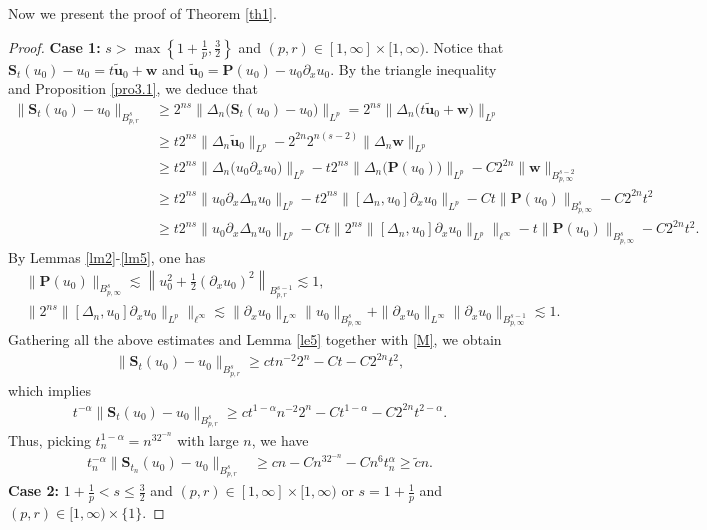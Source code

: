 \documentclass[12pt]{article}
\newcommand{\bal}{\begin{align}}
\newcommand{\bbal}{\begin{align*}}
\newcommand{\pa}{\partial}
\newcommand{\fr}{\frac}
\newcommand{\De}{\Delta}
\newcommand{\les}{\lesssim}
\newcommand{\f}{\left}
\newcommand{\g}{\right}
\begin{document}
Now we present the proof of Theorem \ref{th1}.
\begin{proof}

{\bf Case 1:} $s>\max\f\{1+\frac{1}{p},\frac{3}{2}\g\}$ and $(p, r)\in [1, \infty]\times [1, \infty)$.
Notice that $\mathbf{S}_{t}(u_0)-u_0=t\mathbf{\widetilde{u}}_0+\mathbf{w}$ and $\mathbf{\widetilde{u}}_0=\mathbf{P}(u_0)-u_0\pa_x u_0.$ By the triangle inequality and Proposition \ref{pro3.1}, we deduce that
\bal\label{M}
\|\mathbf{S}_{t}(u_0)-u_0\|_{B^{s}_{p,r}}
&\geq2^{{ns}}
\big\|\De_{n}\big(\mathbf{S}_{t}(u_0)-u_0\big)\big\|_{L^p}
=2^{{ns}}\big\|\De_{n}\big(t\mathbf{\widetilde{u}}_0+\mathbf{w}\big)\big\|_{L^p}
\nonumber\\&\geq t2^{{ns}}\|\De_{n}\mathbf{\widetilde{u}}_0\|_{L^p}
-2^{{2n}}2^{{n(s-2)}}
\big\|\De_{n}\mathbf{w}\big\|_{L^p}\nonumber\\
&\geq t2^{{n}s}\|\De_{n}\big(u_0\pa_xu_0\big)\|_{L^p}-
t2^{{n}s}\|\De_{n}\big(\mathbf{P}(u_0)\big)\|_{L^p}-C2^{2{n}}\|\mathbf{w}\|_{B^{s-2}_{p,\infty}}
\nonumber\\&\geq t2^{{n}s}\|u_0\pa_x\De_{n}u_0\|_{L^p}-t2^{{n}s}\|[\De_{n},u_0]\pa_xu_0\|_{L^p}-
Ct\|\mathbf{P}(u_0)\|_{B^{s}_{p,\infty}}-C2^{2{n}}t^2\nonumber\\&\geq t2^{{n}s}\|u_0\pa_x\De_{n}u_0\|_{L^p}-Ct\big\|2^{{n}s}\|[\De_{n},u_0]\pa_xu_0\|_{L^p}\big\|_{\ell^\infty}-t\|\mathbf{P}(u_0)\|_{B^{s}_{p,\infty}}-C2^{2{n}}t^2.
\end{align}
By Lemmas \ref{lm2}-\ref{lm5}, one has
\bbal
&\|\mathbf{P}(u_0)\|_{B^{s}_{p,\infty}}\les \f\|u_0^{2}+\fr12(\pa_xu_0)^2\g\|_{B^{s-1}_{p,r}}\les 1,\\
&\big\|2^{{n}s}\|[\De_{n},u_0]\pa_xu_0\|_{L^p}\big\|_{\ell^\infty}\les \|\pa_xu_0\|_{L^\infty}\|u_0\|_{B^{s}_{p,\infty}}+
\|\pa_xu_0\|_{L^\infty}\|\pa_xu_0\|_{B^{s-1}_{p,\infty}}\les 1.
\end{align*}
Gathering all the above estimates and Lemma \ref{le5} together with \eqref{M}, we obtain
\bbal
\|\mathbf{S}_{t}(u_0)-u_0\|_{B^{s}_{p,r}}\geq ctn^{-2}2^{n}-Ct-C2^{2{n}}t^2,
\end{align*}
which implies
\bbal
t^{-\alpha}\|\mathbf{S}_{t}(u_0)-u_0\|_{B^{s}_{p,r}}\geq ct^{1-\alpha}n^{-2}2^{n}-Ct^{1-\alpha}-C2^{2{n}}t^{2-\alpha}.
\end{align*}
Thus, picking $t^{1-\alpha}_n=n^32^{-n}$ with large $n$, we have
\bbal
t^{-\alpha}_n\|\mathbf{S}_{t_n}(u_0)-u_0\|_{B^{s}_{p,r}}&\geq cn-Cn^32^{-n}-Cn^{6}t_n^{\alpha}
\geq \tilde{c}n.
\end{align*}
{\bf Case 2:} $1+\frac{1}{p}<s\leq\frac{3}{2}$ and $(p, r)\in [1, \infty]\times [1, \infty)$ or $s=1+\frac{1}{p}$ and $(p, r)\in [1, \infty)\times \{1\}$.

\end{proof}
\end{document}
